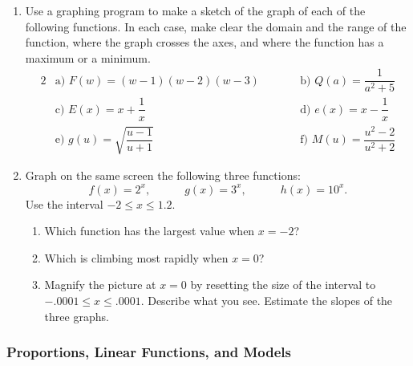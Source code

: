 \begin{enumerate}
  \begin{enumerate}
  \item Graph the two functions $f(x) = \sin(x)$ and $g(x) = \cos(3x)$ on
the interval $0 \leq x \leq 1$.

  \item Find a solution of the equation $\sin(x) = \cos(3x)$ that is
accurate to six decimal places.

  \item Find {\em another\/} solution of the equation $\sin(x) =
\cos(3x)$, accurate to four decimal places.  Explain how you found it.



\end{enumerate}
\item Use a graphing program to make a sketch of the graph of each of
the following functions.  In each case, make clear the domain and the
range of the function, where the graph crosses the axes, and where the
function has a maximum or a minimum.
\begin{alignat*}{2}
&\text{a) } F(w) = (w-1)(w-2)(w-3) &\qquad
	&\text{b) } Q(a) = \dfrac{1}{a^2+5} \\[3pt]
&\text{c) } E(x) = x + \dfrac{1}{x}  &
        &\text{d) } e(x) = x - \dfrac{1}{x}  \\[3pt]
&\text{e) } g(u) = \sqrt{\dfrac{u-1}{u+1}} &
        &\text{f) } M(u) = \dfrac{u^2-2}{u^2+2}  
\end{alignat*}


\item Graph on the same screen the following three functions:
\[
f(x) = 2^x, \quad\qquad g(x) = 3^x, \quad\qquad h(x) = 10^x.
\]
Use the interval $-2 \leq x \leq 1.2$.

  \begin{enumerate}
  \item Which function has the largest value when $x = -2$?

  \item Which is climbing most rapidly when $x = 0$?

  \item Magnify the picture at $x = 0$ by resetting the size of the
interval to $-.0001 \leq x \leq .0001$.  Describe what you see.
Estimate the slopes of the three graphs.


\end{enumerate}
\end{enumerate}
\subsubsection{Proportions, Linear Functions, and Models}
\label{subsubsec:proportions-linear-functions-and-models}




